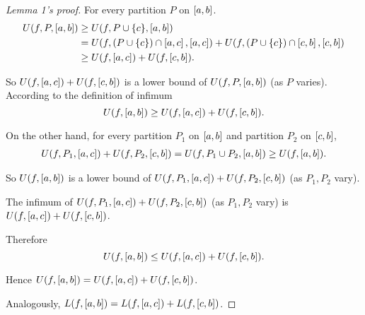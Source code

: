 \begin{proof}[Lemma 1's proof]
    For every partition $P$ on $\left[{a, b}\right]$.
    \begin{align*}
        U(f, P, \left[{a, b}\right]) & \geq U(f, P\cup\{c\}, \left[{a, b}\right])                                                                                              \\
                                       & = U(f, (P\cup\{c\})\cap\left[{a, c}\right], \left[{a, c}\right]) + U(f, (P\cup\{c\})\cap\left[{c, b}\right], \left[{c, b}\right]) \\
                                       & \geq U(f, \left[{a, c}\right]) + U(f, \left[{c, b}\right]).
    \end{align*}

    So $U(f, \left[{a, c}\right]) + U(f, \left[{c, b}\right])$ is a lower bound of $U(f, P, \left[{a, b}\right])$ (as $P$ varies). According to the definition of infimum
    \[
        U(f, \left[{a, b}\right])\geq U(f, \left[{a, c}\right]) + U(f, \left[{c, b}\right]).
    \]

    On the other hand, for every partition $P_{1}$ on $\left[{a, b}\right]$ and partition $P_{2}$ on $\left[{c, b}\right]$,
    \begin{align*}
        U(f, P_{1}, \left[{a, c}\right]) + U(f, P_{2}, \left[{c, b}\right]) = U(f, P_{1}\cup P_{2}, \left[{a, b}\right]) \geq U(f, \left[{a, b}\right]).
    \end{align*}

    So $U(f, \left[{a, b}\right])$ is a lower bound of $U(f, P_{1}, \left[{a, c}\right]) + U(f, P_{2}, \left[{c, b}\right])$ (as $P_{1}, P_{2}$ vary).

    The infimum of $U(f, P_{1}, \left[{a, c}\right]) + U(f, P_{2}, \left[{c, b}\right])$ (as $P_{1}, P_{2}$ vary) is $U(f, \left[{a, c}\right]) + U(f, \left[{c, b}\right])$.

    Therefore
    \[
        U(f, \left[{a, b}\right])\leq U(f, \left[{a, c}\right]) + U(f, \left[{c, b}\right]).
    \]

    Hence $U(f, \left[{a, b}\right]) = U(f, \left[{a, c}\right]) + U(f, \left[{c, b}\right])$.

    Analogously, $L(f, \left[{a, b}\right]) = L(f, \left[{a, c}\right]) + L(f, \left[{c, b}\right])$.
\end{proof}

